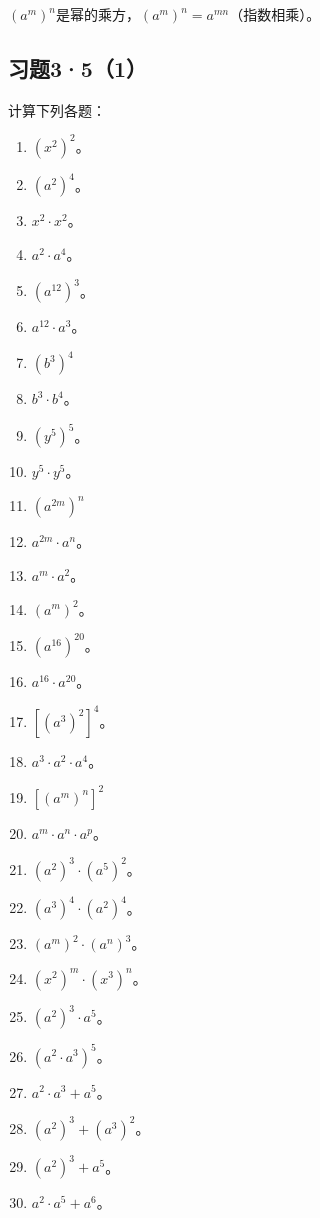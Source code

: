 \((a^{m})^{n}\)是幂的乘方，\((a^{m})^{n}=a^{mn}\)（指数相乘）。

\subsection{习题3·5（1）}

计算下列各题：

\begin{enumerate}[start=1]
\item
  \((x^{2})^{2}\)。
\item
  \((a^{2})^{4}\)。
\item
  \(x^{2} \cdot x^{2}\)。
\item
  \(a^2 \cdot a^4\)。
\item
  \((a^{12})^3\)。
\item
  \(a^{12} \cdot a^3\)。
\item
  \((b^3)^4\)
\item
  \(b^{3} \cdot b^{4}\)。
\item
  \((y^{5})^{5}\)。
\item
  \(y^{5} \cdot y^{5}\)。
\item
  \((a^{2m})^n\)
\item
  \(a^{2m} \cdot a^n\)。
\item
  \(a^m \cdot a^2\)。
\item
  \((a^{m})^{2}\)。
\item
  \((a^{16})^{20}\)。
\item
  \(a^{16} \cdot a^{20}\)。
\item
  \(\left[(a^3)^2\right]^4\)。
\item
  \(a^3 \cdot a^2 \cdot a^4\)。
\item
  \(\left[(a^m)^n\right]^2\)
\item
  \(a^m \cdot a^n \cdot a^p\)。
\item
  \((a^2)^3 \cdot (a^5)^2\)。
\item
  \((a^3)^4 \cdot (a^2)^4\)。
\item
  \((a^{m})^{2} \cdot (a^{n})^{3}\)。
\item
  \((x^{2})^{m} \cdot (x^{3})^{n}\)。
\item
  \((a^2)^3 \cdot a^5\)。
\item
  \((a^2 \cdot a^3)^5\)。
\item
  \(a^2 \cdot a^3 + a^5\)。
\item
  \((a^2)^3 + (a^3)^2\)。
\item
  \((a^2)^3 + a^5\)。
\item
  \(a^2 \cdot a^5 + a^6\)。
\end{enumerate}

